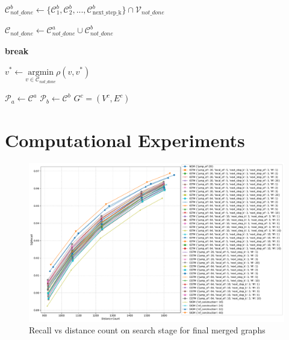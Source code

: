 \documentclass{article}
\begin{document}
\begin{algorithm}
\begin{algorithmic}[1]
        \State $\mathcal{C}^b_{not\_done} \gets \{\mathcal{C}^b_1, \mathcal{C}^b_2, ..., \mathcal{C}^b_{ \text{next\_step\_k} } \}  \cap \mathcal{V}_{not\_done}$
        
        
        \State $\mathcal{C}_{not\_done} \gets \mathcal{C}^a_{not\_done} \cup \mathcal{C}^b_{not\_done}$
        
            \State \textbf{break}
        \EndIf
        
        \State $v^* \gets \underset{v \in \mathcal{C}_{not\_done}}{\mathrm{argmin}} \rho(v, v^*)$
        
        \State $\mathcal{P}_a \gets \mathcal{C}^a$
        \State $\mathcal{P}_b \gets \mathcal{C}^b$
    \EndWhile
\EndWhile
\State \Return $G^c=(V^c,E^c)$
\end{algorithmic}
\end{algorithm}

\section{Computational Experiments}

\begin{figure}
  \centering
  \includegraphics[width=1.\linewidth]{figs/recall_vs_distance_count.pdf}
  \caption{Recall vs distance count on search stage for final merged graphs}
\label{fig:search}
\end{figure}


\end{document}
